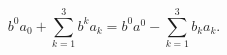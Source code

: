 \documentclass{article}
\theoremstyle{definition}
\theoremstyle{remark}
\newcommand{\er}{\eqref}
\newcommand{\er}{\eqref}
\begin{document}
\begin{comment}
if we consider the scalar field $\Lambda$ on the group
$\mathcal{S}_0$ defined by:
\begin{equation}\label{fgjfjhgghhgjghjhjkkkkgjghghuiiiulkkjKKyuyyu0ioint}
\Lambda:=b^0a_0+\sum_{k=1}^{3}b^ka_k
\end{equation}
then by inserting
\er{fgjfjhgghhgjghjhjkkkkgjghghuiiiulkkjKKyuyyuiouiint} and
\er{fgjfjhgghhgjghjhjkkkkgjghghuiiiulkkjKKyuyyuuuuiiuiiint} into
\er{fgjfjhgghhgjghjhjkkkkgjghghuiiiulkkjKKyuyyu0ioint} we deduce:
\begin{equation}\label{fgjfjhgghhgjghjhjkkkkgjghghuiiiulkkjKKyuyyu0ioioioint}
\Lambda=b^0\left(a^0-\sum_{k=1}^{3}\frac{1}{c}v_ka_k\right)+\sum_{k=1}^{3}\left(-b_{k}+\frac{1}{c}b^0v_k\right)a_k=b^0a^0-\sum_{k=1}^{3}b_{k}a_k.
\end{equation}
So,
\end{comment}
%
%
%
\begin{equation}\label{fgjfjhgghhgjghjhjkkkkgjghghuiiiulkkjKKyuyyu0ioioiogghghghint}
b^0a_0+\sum_{k=1}^{3}b^ka_k=b^0a^0-\sum_{k=1}^{3}b_{k}a_k.
\end{equation}
\end{document}
